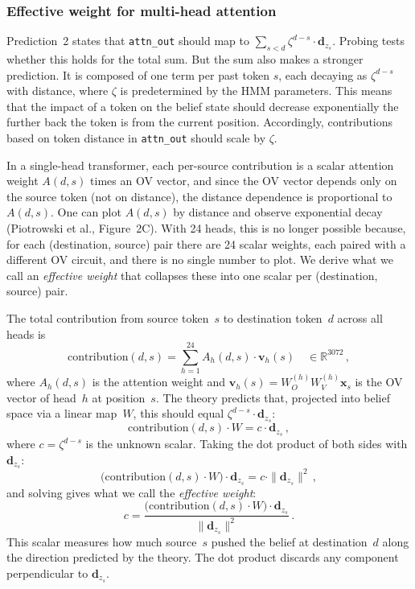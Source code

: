 \documentclass[midterm]{sparreport}
\begin{document}
 \subsubsection{Effective weight for multi-head attention}
\label{sec:effective_weight}
Prediction~2 states that \texttt{attn\_out} should map to $\sum_{s < d} \zeta^{d-s} \cdot \mathbf{d}_{z_s}$. Probing tests whether this holds for the total sum. But the sum also makes a stronger prediction. It is composed of one term per past token $s$, each decaying as $\zeta^{d-s}$ with distance, where $\zeta$ is predetermined by the HMM parameters. This means that the impact of a token on the belief state should decrease exponentially the further back the token is from the current position. Accordingly, contributions based on token distance in \texttt{attn\_out} should scale by $\zeta$. 

In a single-head transformer, each per-source contribution is a scalar attention weight $A(d,s)$ times an OV vector, and since the OV vector depends only on the source token (not on distance), the distance dependence is proportional to $A(d,s)$. One can plot $A(d,s)$ by distance and observe exponential decay (Piotrowski et al., Figure~2C). With 24 heads, this is no longer possible because, for each (destination, source) pair there are 24 scalar weights, each paired with a different OV circuit, and there is no single number to plot. We derive what we call an \textit{effective weight} that collapses these into one scalar per (destination, source) pair.
 
The total contribution from source token~$s$ to destination token~$d$ across all heads is
\begin{equation}
\text{contribution}(d, s) = \sum_{h=1}^{24} A_h(d,s) \cdot \mathbf{v}_h(s) \quad \in \mathbb{R}^{3072}\,,
\end{equation}
where $A_h(d,s)$ is the attention weight and $\mathbf{v}_h(s) = W_O^{(h)} W_V^{(h)} \mathbf{x}_s$ is the OV vector of head~$h$ at position~$s$. The theory predicts that, projected into belief space via a linear map~$W$, this should equal $\zeta^{d-s} \cdot \mathbf{d}_{z_s}$:
\begin{equation}
\text{contribution}(d,s) \cdot W = c \cdot \mathbf{d}_{z_s}\,,
\label{eq:effective_weight_setup}
\end{equation}
where $c = \zeta^{d-s}$ is the unknown scalar. Taking the dot product of both sides with $\mathbf{d}_{z_s}$:
\begin{equation}
\big(\text{contribution}(d,s) \cdot W\big) \cdot \mathbf{d}_{z_s} = c \cdot \|\mathbf{d}_{z_s}\|^2\,,
\end{equation}
and solving gives what we call the \emph{effective weight}:
\begin{equation}
c = \frac{\big(\text{contribution}(d,s) \cdot W\big) \cdot \mathbf{d}_{z_s}}{\|\mathbf{d}_{z_s}\|^2}\,.
\label{eq:effective_weight}
\end{equation}
This scalar measures how much source~$s$ pushed the belief at destination~$d$ along the direction predicted by the theory. The dot product discards any component perpendicular to $\mathbf{d}_{z_s}$.
\end{document}
